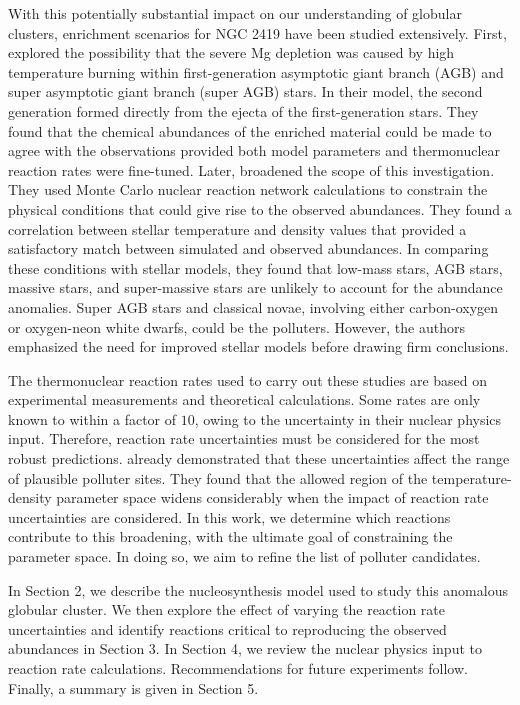\documentclass[twocolumn]{aastex6}
\begin{document}
With this potentially substantial impact on our understanding of globular clusters, enrichment scenarios for NGC 2419 have been studied extensively. First, \citet{Ventura_2012} explored the possibility that the severe Mg depletion was caused by high temperature burning within first-generation asymptotic giant branch (AGB) and super asymptotic giant branch (super AGB) stars. In their model, the second generation formed directly from the ejecta of the first-generation stars. They found that the chemical abundances of the enriched material could be made to agree with the observations provided both model parameters and thermonuclear reaction rates were fine-tuned. Later, \citet{Iliadis_2016} broadened the scope of this investigation. They used Monte Carlo nuclear reaction network calculations to constrain the physical conditions that could give rise to the observed abundances. They found a correlation between stellar temperature and density values that provided a satisfactory match between simulated and observed abundances. In comparing these conditions with stellar models, they found that low-mass stars, AGB stars, massive stars, and super-massive stars are unlikely to account for the abundance anomalies. Super AGB stars and classical novae, involving either carbon-oxygen or oxygen-neon white dwarfs, could be the polluters. 
However, the authors emphasized the need for improved stellar models before drawing firm conclusions.
\par
The thermonuclear reaction rates used to carry out these studies are based on experimental measurements and theoretical calculations. 
Some rates are only known to within a factor of $10$, owing to the uncertainty in their nuclear physics input. 
Therefore, reaction rate uncertainties must be considered for the most robust predictions. 
\citet{Iliadis_2016} already demonstrated that these uncertainties affect the range of plausible polluter sites. 
They found that the allowed region of the temperature-density parameter space widens considerably when the impact of reaction rate uncertainties are considered.
In this work, we determine which reactions contribute to this broadening, with the ultimate goal of constraining the parameter space.
In doing so, we aim to refine the list of polluter candidates.
\par
In Section 2, we describe the nucleosynthesis model used to study this anomalous globular cluster.
We then explore the effect of varying the reaction rate uncertainties and identify reactions critical to reproducing the observed abundances in Section 3.
In Section 4, we review the nuclear physics input to reaction rate calculations. Recommendations for future experiments follow. Finally, a summary is given in Section 5.
\end{document}
